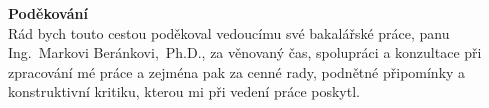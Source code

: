 \newpage
\pagestyle{empty}

\noindent
{\large\bfseries Poděkování}\\

\noindent
Rád bych touto cestou poděkoval vedoucímu své bakalářské práce, panu Ing.~Markovi Beránkovi,~Ph.D., za věnovaný čas, spolupráci a konzultace při zpracování mé práce a zejména pak za cenné rady, podnětné připomínky a konstruktivní kritiku, kterou mi při vedení práce poskytl.
